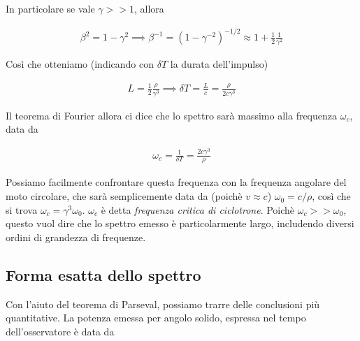 \documentclass{report}
\begin{document}
In particolare se vale \(\gamma >> 1\), allora 

\begin{align}
    \beta^2 = 1 - \gamma^2 \implies \beta^{-1} = (1 - \gamma^{-2})^{-1/2} \approx 1 + \frac{1}{2}\frac{1}{\gamma^2}
\end{align}

Così che otteniamo (indicando con \(\delta T\) la durata dell'impulso)

\begin{align}
    L = \frac{1}{2}\frac{\rho}{\gamma^3} \implies \delta T = \frac{L}{c} = \frac{\rho}{2c\gamma^3}
\end{align}

Il teorema di Fourier allora ci dice che lo spettro sarà massimo alla frequenza \(\omega_c\), data da 

\begin{tcolorbox}[colback=doc!15, colframe=black, boxrule=1pt]
\begin{align}
    \omega_c = \frac{1}{\delta T} = \frac{2c\gamma^3}{\rho}
\end{align}
\end{tcolorbox}

Possiamo facilmente confrontare questa frequenza con la frequenza angolare del moto circolare, che sarà semplicemente data da (poichè \(v \approx c\)) \(\omega_0 = c/\rho\), così che si trova \(\omega_c = \gamma^3 \omega_0\). \(\omega_c\) è detta \emph{frequenza critica di ciclotrone}. Poichè \(\omega_c >> \omega_0\), questo vuol dire che lo spettro emesso è particolarmente largo, includendo diversi ordini di grandezza di frequenze. \\


\subsection{Forma esatta dello spettro}

Con l'aiuto del teorema di Parseval, possiamo trarre delle conclusioni più quantitative. La potenza emessa per angolo solido, espressa nel tempo dell'osservatore è data da 
\end{document}
